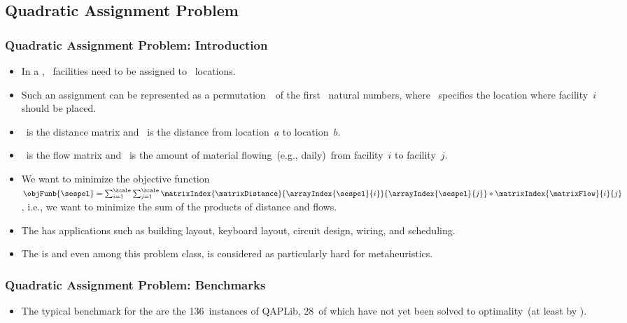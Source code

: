 \documentclass[aspectratio=169,mathserif,notheorems]{beamer}%
\begin{document}
\subsection{Quadratic Assignment Problem}%
%
\begin{frame}[t]%
\frametitle{Quadratic Assignment Problem: Introduction}%
\begin{itemize}%
%
\item In a , \scale~facilities need to be assigned to \scale~locations\cite{KB1957APATLOEA,BCPP1998TQAP,LdABNHQ2007ASFTQAP,CWTW2024FFAOWBFGSORLSOTQAP}.%
%
\item<2-> Such an assignment can be represented as a permutation~\sespel\ of the first \scale~natural numbers, where ~specifies the location where facility~$i$ should be placed.%
%
\item<3-> \matrixDistance~is the distance matrix and ~is the distance from location~$a$ to location~$b$.%
%
\item<4-> \matrixFlow~is the flow matrix and ~is the amount of material flowing~(e.g., daily)~from facility~$i$ to facility~$j$.%
%
\item<5-> We want to minimize the objective function~$\objFunb{\sespel}=\sum_{i=1}^{\scale}\sum_{j=1}^{\scale} \matrixIndex{\matrixDistance}{\arrayIndex{\sespel}{i}}{\arrayIndex{\sespel}{j}}*\matrixIndex{\matrixFlow}{i}{j}$, i.e., we want to minimize the sum of the products of distance and flows.%
%
\item<6-> The  has applications such as building layout\cite{E1977HLAAQAP,CNTSA2021HLDRAAQAPWGD,KP1978CALD}, keyboard layout\cite{BO1977EVSMQZ}, circuit design\cite{EW1990OSOSTFSM}, wiring\cite{S1961TBWPAPA}, and scheduling\cite{S2011SISBSMSWST}.%
%
\item<7-> The  is \npComplete\cite{SGA1976PCAP,DPST2006MFHOSATSEAGAACMACS} and even among this problem class, is considered as particularly hard for \glspl{metaheuristic}\cite{LdABNHQ2007ASFTQAP,BAP2015MAFTQAPPAC,S2006ILSFTQAP,BCPP1998TQAP}.%
%
\end{itemize}%
%
%
%
\end{frame}%
%
\begin{frame}%
\frametitle{Quadratic Assignment Problem: Benchmarks}%
\begin{itemize}%
\item The typical benchmark for the  are the 136~instances of \gls{QAPLib}\cite{BKR1997QAQAPL,BCKRAH2022QAQAPLPIAS}, 28~of which have not yet been solved to optimality\cite{A2023TQC}~(at least by \citeyear{A2023TQC}).%
\end{itemize}%
\end{frame}%
\end{document}
